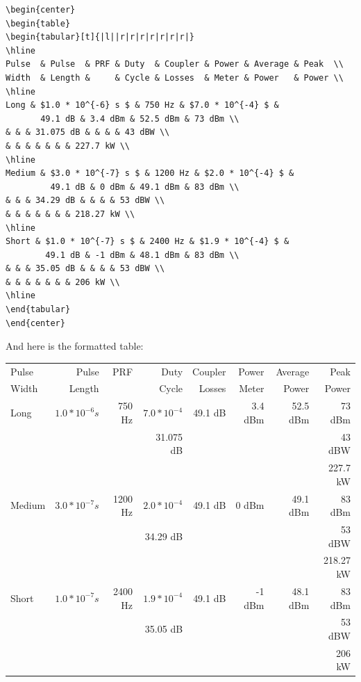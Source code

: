 \begin{Verbatim}
\begin{center}
\begin{table}
\begin{tabular}[t]{|l||r|r|r|r|r|r|r|}
\hline
Pulse  & Pulse  & PRF & Duty  & Coupler & Power & Average & Peak  \\
Width  & Length &     & Cycle & Losses  & Meter & Power   & Power \\
\hline
Long & $1.0 * 10^{-6} s $ & 750 Hz & $7.0 * 10^{-4} $ & 
       49.1 dB & 3.4 dBm & 52.5 dBm & 73 dBm \\
& & & 31.075 dB & & & & 43 dBW \\
& & & & & & & 227.7 kW \\
\hline
Medium & $3.0 * 10^{-7} s $ & 1200 Hz & $2.0 * 10^{-4} $ & 
         49.1 dB & 0 dBm & 49.1 dBm & 83 dBm \\
& & & 34.29 dB & & & & 53 dBW \\
& & & & & & & 218.27 kW \\
\hline
Short & $1.0 * 10^{-7} s $ & 2400 Hz & $1.9 * 10^{-4} $ & 
        49.1 dB & -1 dBm & 48.1 dBm & 83 dBm \\
& & & 35.05 dB & & & & 53 dBW \\
& & & & & & & 206 kW \\
\hline
\end{tabular}
\end{center}
\end{Verbatim}

And here is the formatted table:

\begin{center}
\begin{tabular}[t]{|l||r|r|r|r|r|r|r|}
\hline
Pulse  & Pulse  & PRF & Duty  & Coupler & Power & Average & Peak  \\
Width  & Length &     & Cycle & Losses  & Meter & Power   & Power \\
\hline
Long & $1.0 * 10^{-6} s $ & 750 Hz & $7.0 * 10^{-4} $ &
       49.1 dB & 3.4 dBm & 52.5 dBm & 73 dBm \\
& & & 31.075 dB & & & & 43 dBW \\
& & & & & & & 227.7 kW \\
\hline
Medium & $3.0 * 10^{-7} s $ & 1200 Hz & $2.0 * 10^{-4} $ &
         49.1 dB & 0 dBm & 49.1 dBm & 83 dBm \\
& & & 34.29 dB & & & & 53 dBW \\
& & & & & & & 218.27 kW \\
\hline
Short & $1.0 * 10^{-7} s $ & 2400 Hz & $1.9 * 10^{-4} $ & 
        49.1 dB & -1 dBm & 48.1 dBm & 83 dBm \\
& & & 35.05 dB & & & & 53 dBW \\
& & & & & & & 206 kW \\
\hline
\end{tabular}
\end{center}

